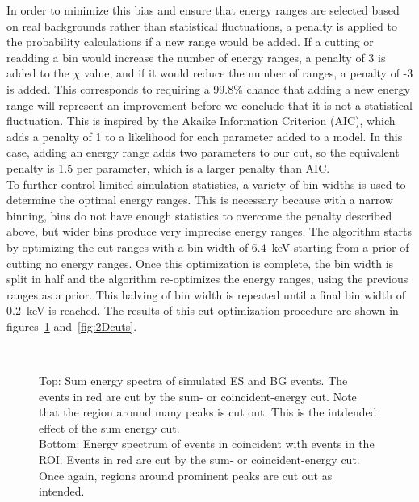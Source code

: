 \documentclass[notitlepage,rmp,aps,10pt]{revtex4-1}
\begin{document}
In order to minimize this bias and ensure that energy ranges are selected based on real backgrounds rather than statistical fluctuations, a penalty is applied to the probability calculations if a new range would be added.
If a cutting or readding a bin would increase the number of energy ranges, a penalty of 3 is added to the $\chi$ value, and if it would reduce the number of ranges, a penalty of -3 is added.
This corresponds to requiring a 99.8\% chance that adding a new energy range will represent an improvement before we conclude that it is not a statistical fluctuation.
This is inspired by the Akaike Information Criterion (AIC), which adds a penalty of 1 to a likelihood for each parameter added to a model.
In this case, adding an energy range adds two parameters to our cut, so the equivalent penalty is 1.5 per parameter, which is a larger penalty than AIC.
\\
To further control limited simulation statistics, a variety of bin widths is used to determine the optimal energy ranges.
This is necessary because with a narrow binning, bins do not have enough statistics to overcome the penalty described above, but wider bins produce very imprecise energy ranges.
The algorithm starts by optimizing the cut ranges with a bin width of 6.4~keV starting from a prior of cutting no energy ranges.
Once this optimization is complete, the bin width is split in half and the algorithm re-optimizes the energy ranges, using the previous ranges as a prior.
This halving of bin width is repeated until a final bin width of 0.2~keV is reached.
The results of this cut optimization procedure are shown in figures~\ref{fig:sumandcoinEcuts} and~\ref{fig:2Dcuts}.
\\
\begin{figure}[!h]
  \centering
  \\
  \caption[Sum and coincident simulated energy spectra with cuts]{\label{fig:sumandcoinEcuts}
    Top: Sum energy spectra of simulated ES and BG events. The events in red are cut by the sum- or coincident-energy cut. Note that the region around many peaks is cut out. This is the intdended effect of the sum energy cut.\\
    Bottom: Energy spectrum of events in coincident with events in the ROI. Events in red are cut by the sum- or coincident-energy cut. Once again, regions around prominent peaks are cut out as intended.
  }
\end{figure}
\end{document}
